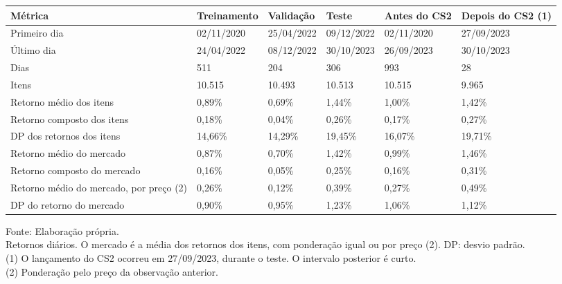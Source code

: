 \begingroup
\setlength{}
\setlength{}
\fontsize{7.0pt}{8.4pt}\selectfont

\setlength{\LTpost}{0mm}
\begin{longtable}{@{\extracolsep{\fill}}llllll}

\toprule
\textbf{Métrica} & \textbf{Treinamento} & \textbf{Validação} & \textbf{Teste} & \textbf{Antes do CS2} & \textbf{Depois do CS2} (1) \\ 
\midrule\addlinespace[2.5pt]
Primeiro dia & 02/11/2020 & 25/04/2022 & 09/12/2022 & 02/11/2020 & 27/09/2023 \\
Último dia & 24/04/2022 & 08/12/2022 & 30/10/2023 & 26/09/2023 & 30/10/2023 \\
Dias & 511 & 204 & 306 & 993 & 28 \\
Itens & 10.515 & 10.493 & 10.513 & 10.515 & 9.965 \\
Retorno médio dos itens & 0,89\% & 0,69\% & 1,44\% & 1,00\% & 1,42\% \\
Retorno composto dos itens & 0,18\% & 0,04\% & 0,26\% & 0,17\% & 0,27\% \\
DP dos retornos dos itens & 14,66\% & 14,29\% & 19,45\% & 16,07\% & 19,71\% \\
Retorno médio do mercado & 0,87\% & 0,70\% & 1,42\% & 0,99\% & 1,46\% \\
Retorno composto do mercado & 0,16\% & 0,05\% & 0,25\% & 0,16\% & 0,31\% \\
Retorno médio do mercado, por preço (2) & 0,26\% & 0,12\% & 0,39\% & 0,27\% & 0,49\% \\
DP do retorno do mercado & 0,90\% & 0,95\% & 1,23\% & 1,06\% & 1,12\% \\
\bottomrule
\end{longtable}
\begin{minipage}{\linewidth}
Fonte: Elaboração própria.\\
Retornos diários. O mercado é a média dos retornos dos itens, com ponderação igual ou por preço (2). DP: desvio padrão.\\
(1) O lançamento do CS2 ocorreu em 27/09/2023, durante o teste. O intervalo posterior é curto.\\
(2) Ponderação pelo preço da observação anterior.\\
\end{minipage}
\endgroup
